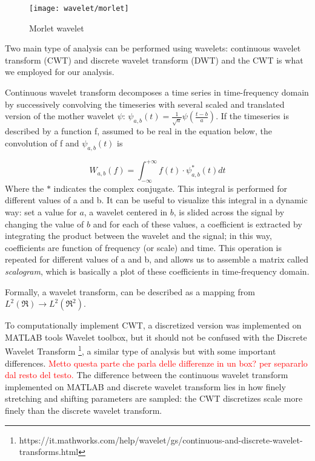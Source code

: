 \documentclass[11pt]{report}
\begin{document}
\begin{figure}[h]
\centering
\texttt{[image: wavelet/morlet]}
\caption{Morlet wavelet}
\label{fig:wavelet_morlet}
\end{figure}

Two main type of analysis can be performed using wavelets: continuous wavelet transform (CWT) and discrete wavelet transform (DWT) and the CWT is what we employed for our analysis.

Continuous wavelet transform decomposes a time series in time-frequency domain by successively convolving the timeseries with several scaled and translated version of the mother wavelet $\psi$: $\psi_{a, b}\left(t\right) = \frac{1}{\sqrt{a}}\psi(\frac{t-b}{a})$.
If the timeseries is described by a function f, assumed to be real in the equation below, the convolution of f and $\psi_{a, b}\left(t\right)$ is

\begin{equation}
W_{a,b}(f) = \int_{-\infty}^{+\infty}  f(t) \cdot \psi_{a, b}^\ast \left(t\right)   dt
\end{equation}
Where the $\ast$ indicates the complex conjugate.
This integral is performed for different values of a and b.
It can be useful to visualize this integral in a dynamic way: set a value for $a$, a wavelet centered in $b$, is slided across the signal by changing the value of $b$ and for each of these values, a coefficient is extracted by integrating the product between the wavelet and the signal; in this way, coefficients are function of frequency (or scale) and time. This operation is repeated for different values of a and b, and allows us to assemble a matrix called \emph{scalogram}, which is basically a plot of these coefficients in time-frequency domain.

Formally, a wavelet transform, can be described as a mapping from $L^2(\Re) \rightarrow L^2(\Re^2)$.

To computationally implement CWT, a discretized version was implemented on MATLAB tools Wavelet toolbox, but it should not be confused with the Discrete Wavelet Transform \footnote{https://it.mathworks.com/help/wavelet/gs/continuous-and-discrete-wavelet-transforms.html}, a similar type of analysis but with some important differences.
\textcolor{red}{Metto questa parte che parla delle differenze in un box? per separarlo dal resto del testo. }
The difference between the continuous wavelet transform implemented on MATLAB and discrete wavelet transform lies in how finely stretching and shifting parameters are sampled: the CWT discretizes scale more finely than the discrete wavelet transform.
\end{document}
